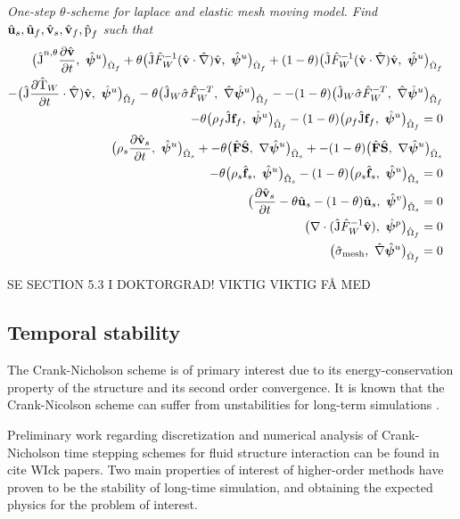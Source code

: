 \begin{prob}
\textit{One-step $\theta$-scheme for laplace and elastic mesh moving model.
Find $\hat{\mathbf{u}}_s, \hat{\mathbf{u}}_f, \hat{\mathbf{v}}_s, \hat{\mathbf{v}}_f, \text{\^{p}}_f $ such that}
\begin{align*}
\big(\text{\^{J}}^{n, \theta} \frac{\partial \hat{\mathbf{v}}}{\partial t}, \ \hat{\bm{\psi}}^u \big)_{\hat{\Omega}_f} +
\theta \big(\text{\^{J}} \hat{F}_W^{-1}(\hat{\mathbf{v}} \cdot \hat{\nabla}) \hat{\mathbf{v}}, \ {\hat{\bm{\psi}}^u} \big)_{\hat{\Omega}_f} + 
(1 - \theta) \big(\text{\^{J}} \hat{F}_W^{-1}(\hat{\mathbf{v}} \cdot \hat{\nabla}) \hat{\mathbf{v}}, \ {\hat{\bm{\psi}}^u} \big)_{\hat{\Omega}_f} \\
- \big(\text{\^{J}}  \frac{\partial \text{\^{T}}_W}{\partial t} \cdot \hat{\nabla}) \hat{\mathbf{v}}, \ {\hat{\bm{\psi}}^u} \big)_{\hat{\Omega}_f}
-\theta \big(\text{\^{J}}_W \hat{\sigma}\hat{F}_W^{-T}, \ {\hat{\nabla}\hat{\bm{\psi}}^u} \big)_{\hat{\Omega}_f} -
- (1 - \theta) \big(\text{\^{J}}_W \hat{\sigma}\hat{F}_W^{-T}, \ {\hat{\nabla}\hat{\bm{\psi}}^u} \big)_{\hat{\Omega}_f} \\
- \theta \big(\rho_f \text{\^{J}} \mathbf{f}_f, \ {{\hat{\bm{\psi}}^u}} \big)_{\hat{\Omega}_f} - 
(1 - \theta) \big(\rho_f \text{\^{J}} \mathbf{f}_f, \ {{\hat{\bm{\psi}}^u}} \big)_{\hat{\Omega}_f}= 0& \\
\big(\rho_s \frac{\partial \hat{\mathbf{v}}_s}{\partial t}, \ {\hat{\bm{\psi}}^u} \big)_{\hat{\Omega}_s} + 
- \theta\big(\hat{\mathbf{F}}\hat{\mathbf{S}}, \ {\nabla \hat{\bm{\psi}}^u} \big)_{\hat{\Omega}_s}  + 
- (1 - \theta) \big(\hat{\mathbf{F}}\hat{\mathbf{S}}, \ {\nabla \hat{\bm{\psi}}^u} \big)_{\hat{\Omega}_s} \\
- \theta \big(\rho_s \hat{\mathbf{f}}_s, \ {\hat{\bm{\psi}}^u} \big)_{\hat{\Omega}_s} 
- (1 - \theta) \big(\rho_s \hat{\mathbf{f}}_s, \ {\hat{\bm{\psi}}^u} \big)_{\hat{\Omega}_s} = 0 \\
\big(\frac{\partial \hat{\mathbf{v}}_s}{\partial t} - \theta \hat{\mathbf{u}}_s - (1 - \theta)\hat{\mathbf{u}}_s, \ {\hat{\bm{\psi}}^v} \big)_{\hat{\Omega}_s}  = 0&\\
\big(\nabla \cdot (\text{\^{J}} \hat{F}_W^{-1} \hat{\mathbf{v}}), \ {\hat{\bm{\psi}}^p} \big)_{\hat{\Omega}_f} = 0& \\
\big(\hat{\sigma}_{\text{mesh}}, \ {\hat{\nabla}\hat{\bm{\psi}}^u} \big)_{\hat{\Omega}_f} = 0&
\end{align*} 
\end{prob}


SE SECTION 5.3 I DOKTORGRAD! VIKTIG VIKTIG FÅ MED

\subsection{Temporal stability}

The Crank-Nicholson scheme is of primary interest due to its energy-conservation property of the structure and its second order convergence. It is known that the Crank-Nicolson scheme can suffer from unstabilities for long-term simulations \cite{Wick2013a}.

Preliminary work regarding discretization and numerical analysis of Crank-Nicholson time stepping schemes for fluid structure interaction can be found in cite WIck papers. Two main properties of interest of higher-order methods have proven to be the stability of long-time simulation, and obtaining the expected physics for the problem of interest.

